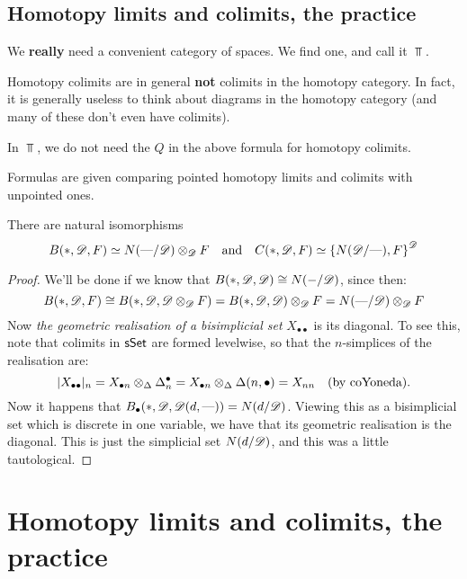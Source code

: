 \documentclass[11pt]{article}
\begin{document}
\begin{7. Homotopy limits and colimits, the practice}
\section*{Homotopy limits and colimits, the practice}
\begin{itemise}
\setlength{\parindent}{.25in}
\item We \textbf{really} need a convenient category of spaces. We find one, and call it $\Top$.
\item Homotopy colimits are in general \textbf{not} colimits in the homotopy category. In fact, it is generally useless to think about diagrams in the homotopy category (and many of these don't even have colimits).
\item In $\Top$, we do not need the $Q$ in the above formula for homotopy colimits. 
\item Formulas are given comparing pointed homotopy limits and colimits with unpointed ones.
\end{itemise}
\begin{thm*}[7.40]
There are natural isomorphisms
\[B(*,\mathscr{D},F)\simeq N(\textup{---} /\mathscr{D})\otimes_{\mathscr{D}} F\quad \textup{and}\quad C(*,\mathscr{D},F)\simeq \left\{N(\mathscr{D}/\textup{---}),F\right\}^{\mathscr{D}}\]
\end{thm*}
\begin{proof}We'll be done if we know that $B(*,\mathscr{D},\mathscr{D})\cong N(-/\mathscr{D})$, since then:
\[B(*,\mathscr{D},F)\cong B(*,\mathscr{D},\mathscr{D}\otimes _{\mathscr{D}} F)=B(*,\mathscr{D},\mathscr{D})\otimes _{\mathscr{D}} F=N(\textup{---} /\mathscr{D})\otimes_{\mathscr{D}} F\]
Now \emph{the geometric realisation of a bisimplicial set} $X_{\bullet \bullet }$ is its diagonal. To see this, note that colimits in $\operatorname{{\mathsf{sSet}}}$ are formed levelwise, so that the $n$-simplices of the realisation are:
\[|X_{\bullet \bullet }|_n=X_{\bullet n}\otimes _\Delta \Delta^\bullet _n=X_{\bullet n}\otimes _\Delta \Delta(n,\bullet )=X_{nn} \textup{\quad (by coYoneda).}\]
Now it happens that $B_\bullet (*,\mathscr{D},\mathscr{D}(d,\textup{---} ))=N(d/\mathscr{D})$. Viewing this as a bisimplicial set which is discrete in one variable, we have that its geometric realisation is the diagonal. This is just the simplicial set $N(d/\mathscr{D})$, and this was a little tautological.
\end{proof}
\end{7. Homotopy limits and colimits, the practice}
\section*{Homotopy limits and colimits, the practice}
\end{document}
